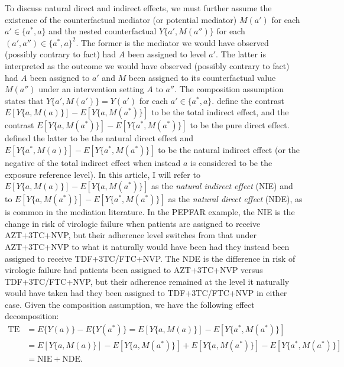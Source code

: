 \documentclass[12pt]{article}
\begin{document}
To discuss natural direct and indirect effects, we must further assume the existence of the counterfactual mediator (or potential mediator) $M(a')$ for each $a'\in\{a^*,a\}$ and the nested counterfactual $Y\{a',M(a'')\}$ for each $(a',a'')\in\{a^*,a\}^2$. The former is the mediator we would have observed (possibly contrary to fact) had $A$ been assigned to level $a'$. The latter is interpreted as the outcome we would have observed (possibly contrary to fact) had $A$ been assigned to $a'$ and $M$ been assigned to its counterfactual value $M(a'')$ under an intervention setting $A$ to $a''$. The composition assumption states that $Y\{a',M(a')\}=Y(a')$ for each $a'\in\{a^*,a\}$. \cite{robins1992identifiability} define the contrast $E[Y\{a,M(a)\}]-E[Y\{a,M(a^*)\}]$ to be the total indirect effect, and the contrast $E[Y\{a,M(a^*)\}]-E[Y\{a^*,M(a^*)\}]$ to be the pure direct effect. \cite{pearl2001direct} defined the latter to be the natural direct effect %
and $E[Y\{a^*,M(a)\}]-E[Y\{a^*,M(a^*)\}]$ %
to be the natural indirect effect (or the negative of the total indirect effect when instead $a$ is considered to be the exposure reference level). In this article, I will refer to $E[Y\{a,M(a)\}]-E[Y\{a,M(a^*)\}]$ as the \emph{natural indirect effect} (NIE) and to $E[Y\{a,M(a^*)\}]-E[Y\{a^*,M(a^*)\}]$ as the \emph{natural direct effect} (NDE), as is common in the mediation literature. In the PEPFAR example, the NIE is the change in risk of virologic failure when patients are assigned to receive AZT+3TC+NVP, but their adherence level switches from that under AZT+3TC+NVP to what it naturally would have been had they instead been assigned to receive TDF+3TC/FTC+NVP. The NDE is the difference in risk of virologic failure had patients been assigned to AZT+3TC+NVP versus TDF+3TC/FTC+NVP, but their adherence remained at the level it naturally would have taken had they been assigned to TDF+3TC/FTC+NVP in either case. Given the composition assumption, we have the following effect decomposition: 
\begin{align*}
    \text{TE} &= E\{Y(a)\}-E\{Y(a^*)\} = E[Y\{a,M(a)\}]-E[Y\{a^*,M(a^*)\}]\\
    &= E[Y\{a,M(a)\}]-E[Y\{a,M(a^*)\}] + E[Y\{a,M(a^*)\}]-E[Y\{a^*,M(a^*)\}]\\ 
    &= \text{NIE} + \text{NDE}.
\end{align*}
\end{document}
